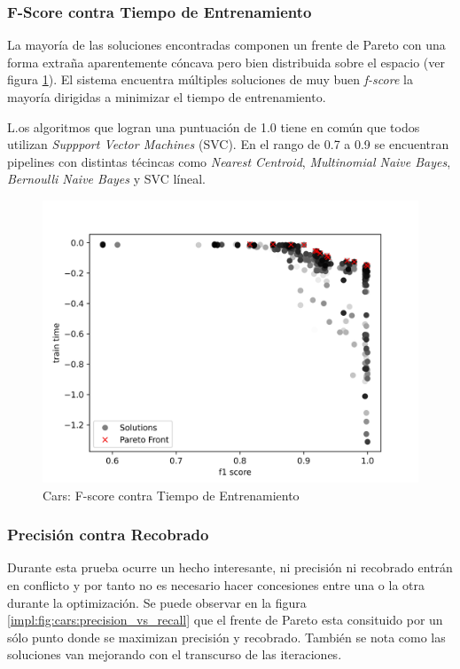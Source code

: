 \subsubsection{F-Score contra Tiempo de Entrenamiento}
La mayor\'ia de las soluciones encontradas componen un frente de Pareto con una forma extra\~na aparentemente c\'oncava pero bien distribuida sobre el espacio (ver figura \ref{impl:fig:cars:fscore_vs_time}).  El sistema encuentra  m\'ultiples soluciones de muy buen \textit{f-score} la mayor\'ia dirigidas a minimizar el tiempo de entrenamiento. 

L.os algoritmos que logran una puntuaci\'on de 1.0 tiene en com\'un que todos utilizan \textit{Suppport Vector Machines} (SVC). En el rango de 0.7 a 0.9 se encuentran pipelines con distintas t\'ecincas como \textit{Nearest Centroid}, \textit{Multinomial Naive Bayes}, \textit{Bernoulli Naive Bayes} y SVC l\'ineal.

\begin{figure}[ht]
    \centering
    \includegraphics[scale=0.65]{Pictures/cars_fscore_vs_time.jpg}
    \caption{Cars: F-score contra Tiempo de Entrenamiento}
    \label{impl:fig:cars:fscore_vs_time}
\end{figure}


\subsubsection{Precisi\'on contra Recobrado}
Durante esta prueba ocurre un hecho interesante, ni precisi\'on ni recobrado entr\'an en conflicto y por tanto no es necesario hacer concesiones entre una o la otra durante la optimizaci\'on. Se puede observar en la figura \ref{impl:fig:cars:precision_vs_recall} que el frente de Pareto esta consituido por un s\'olo punto donde se maximizan precisi\'on y recobrado. Tambi\'en se nota como las soluciones van mejorando con el transcurso de las iteraciones.

